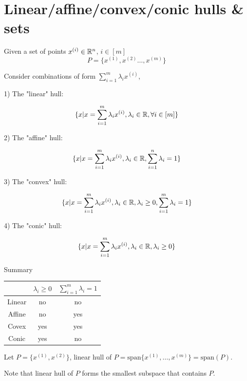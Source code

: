 
\section{Linear/affine/convex/conic hulls \& sets}
Given a set of points $x^{(i)} \in \mathbb{R}^n$, $i\in [m]$
\begin{equation*}
P = \{x^{(1)}, x^{(2)}\ldots, x^{(m)} \}
\end{equation*}

Consider combinations of form $\sum^m_{i=1} \lambda_i x^{(i)}$,

1) The "linear" hull: 

\begin{equation*}
\{x|x = \sum^m_{i=1} \lambda_i x^{(i)}, \lambda_i\in \mathbb{R}, \forall i\in [m] \}
\end{equation*}

2) The "affine" hull: 

\begin{equation*}
\{x|x = \sum^m_{i=1} \lambda_i x^{(i)}, \lambda_i\in \mathbb{R}, \sum^n_{i=1}\lambda_i = 1 \}
\end{equation*}


3) The "convex" hull: 

\begin{equation*}
\{x|x = \sum^m_{i=1} \lambda_i x^{(i)}, \lambda_i\in \mathbb{R}, \lambda_i \geq 0, \sum^m_{i=1}\lambda_i = 1 \}
\end{equation*}


4) The "conic" hull: 

\begin{equation*}
\{x|x = \sum^m_{i=1} \lambda_i x^{(i)}, \lambda_i\in \mathbb{R}, \lambda_i \geq 0 \}
\end{equation*}

Summary
\begin{center}
	\begin{tabular}{|c|c|c|}
	\hline  
   & $\lambda_i \geq 0$   & $\sum^m_{i=1}\lambda_i = 1$ \\
	\hline  
Linear&  no  & no \\
	\hline  
Affine&  no  &yes  \\
	\hline 
Covex&  yes  & yes \\
	\hline  
Conic&  yes  &  no\\
	\hline 
\end{tabular}
\end{center}


\begin{example}
	
Let $P = \{x^{(1)}, x^{(2)} \}$, linear hull of $P = \text{span}\{x^{(1)},\ldots,x^{(m)} \} =\text{span}(P)$.

Note that linear hull of $P$ forms the smallest subspace that contains $P$.

\end{example}

